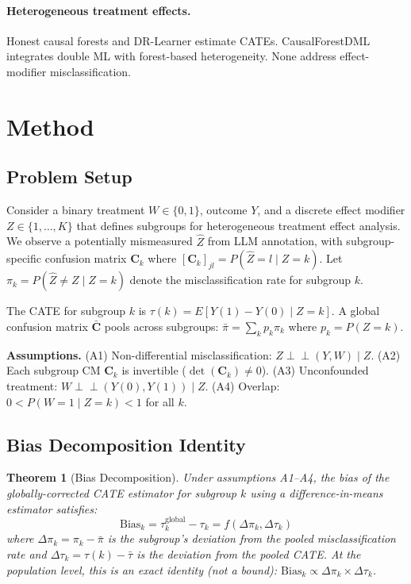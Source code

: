 \documentclass[11pt,twocolumn]{article}
\newtheorem{theorem}{Theorem}
\begin{document}
\paragraph{Heterogeneous treatment effects.}
Honest causal forests \citep{wager2018estimation, athey2019generalized} and DR-Learner \citep{kennedy2023towards} estimate CATEs. CausalForestDML \citep{chernozhukov2018double} integrates double ML with forest-based heterogeneity. None address effect-modifier misclassification.

\section{Method}

\subsection{Problem Setup}

Consider a binary treatment $W \in \{0,1\}$, outcome $Y$, and a discrete effect modifier $Z \in \{1, \ldots, K\}$ that defines subgroups for heterogeneous treatment effect analysis. We observe a potentially mismeasured $\hat{Z}$ from LLM annotation, with subgroup-specific confusion matrix $\mathbf{C}_k$ where $[\mathbf{C}_k]_{jl} = P(\hat{Z}=l \mid Z=k)$. Let $\pi_k = P(\hat{Z} \neq Z \mid Z=k)$ denote the misclassification rate for subgroup $k$.

The CATE for subgroup $k$ is $\tau(k) = E[Y(1) - Y(0) \mid Z=k]$. A global confusion matrix $\bar{\mathbf{C}}$ pools across subgroups: $\bar{\pi} = \sum_k p_k \pi_k$ where $p_k = P(Z=k)$.

\textbf{Assumptions.} (A1) Non-differential misclassification: $\hat{Z} \perp\!\!\!\perp (Y, W) \mid Z$. (A2) Each subgroup CM $\mathbf{C}_k$ is invertible ($\det(\mathbf{C}_k) \neq 0$). (A3) Unconfounded treatment: $W \perp\!\!\!\perp (Y(0), Y(1)) \mid Z$. (A4) Overlap: $0 < P(W=1 \mid Z=k) < 1$ for all $k$.

\subsection{Bias Decomposition Identity}

\begin{theorem}[Bias Decomposition]
Under assumptions A1--A4, the bias of the globally-corrected CATE estimator for subgroup $k$ using a difference-in-means estimator satisfies:
\begin{equation}
\text{Bias}_k = \tau_k^{\text{global}} - \tau_k = f(\Delta\pi_k, \Delta\tau_k)
\label{eq:bias_identity}
\end{equation}
where $\Delta\pi_k = \pi_k - \bar{\pi}$ is the subgroup's deviation from the pooled misclassification rate and $\Delta\tau_k = \tau(k) - \bar{\tau}$ is the deviation from the pooled CATE. At the population level, this is an exact identity (not a bound): $\text{Bias}_k \propto \Delta\pi_k \times \Delta\tau_k$.
\end{theorem}
\end{document}
